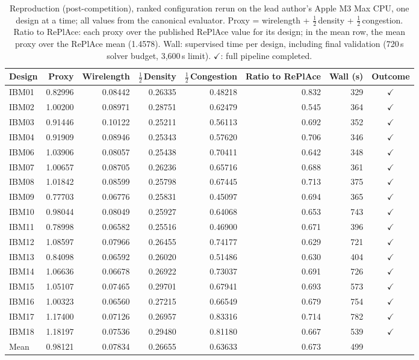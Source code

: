 \begin{table}[htbp]
\centering
\footnotesize
\caption{Reproduction (post-competition), ranked configuration rerun on the lead author's Apple M3 Max CPU, one design at a time; all values from the canonical evaluator. Proxy = wirelength + $\tfrac{1}{2}$\,density + $\tfrac{1}{2}$\,congestion. Ratio to RePlAce: each proxy over the published RePlAce value for its design; in the mean row, the mean proxy over the RePlAce mean (1.4578). Wall: supervised time per design, including final validation (720\,s solver budget, 3,600\,s limit). $\checkmark$: full pipeline completed.}
\label{tab:reproduction}
\begin{tabular}{lrrrrrrc}
\toprule
Design & Proxy & Wirelength & $\tfrac{1}{2}$\,Density & $\tfrac{1}{2}$\,Congestion & Ratio to RePlAce & Wall (s) & Outcome \\
\midrule
IBM01 & 0.82996 & 0.08442 & 0.26335 & 0.48218 & 0.832 & 329 & $\checkmark$ \\
IBM02 & 1.00200 & 0.08971 & 0.28751 & 0.62479 & 0.545 & 364 & $\checkmark$ \\
IBM03 & 0.91446 & 0.10122 & 0.25211 & 0.56113 & 0.692 & 352 & $\checkmark$ \\
IBM04 & 0.91909 & 0.08946 & 0.25343 & 0.57620 & 0.706 & 346 & $\checkmark$ \\
IBM06 & 1.03906 & 0.08057 & 0.25438 & 0.70411 & 0.642 & 348 & $\checkmark$ \\
IBM07 & 1.00657 & 0.08705 & 0.26236 & 0.65716 & 0.688 & 361 & $\checkmark$ \\
IBM08 & 1.01842 & 0.08599 & 0.25798 & 0.67445 & 0.713 & 375 & $\checkmark$ \\
IBM09 & 0.77703 & 0.06776 & 0.25831 & 0.45097 & 0.694 & 365 & $\checkmark$ \\
IBM10 & 0.98044 & 0.08049 & 0.25927 & 0.64068 & 0.653 & 743 & $\checkmark$ \\
IBM11 & 0.78998 & 0.06582 & 0.25516 & 0.46900 & 0.671 & 396 & $\checkmark$ \\
IBM12 & 1.08597 & 0.07966 & 0.26455 & 0.74177 & 0.629 & 721 & $\checkmark$ \\
IBM13 & 0.84098 & 0.06592 & 0.26020 & 0.51486 & 0.630 & 404 & $\checkmark$ \\
IBM14 & 1.06636 & 0.06678 & 0.26922 & 0.73037 & 0.691 & 726 & $\checkmark$ \\
IBM15 & 1.05107 & 0.07465 & 0.29701 & 0.67941 & 0.693 & 573 & $\checkmark$ \\
IBM16 & 1.00323 & 0.06560 & 0.27215 & 0.66549 & 0.679 & 754 & $\checkmark$ \\
IBM17 & 1.17400 & 0.07126 & 0.26957 & 0.83316 & 0.714 & 782 & $\checkmark$ \\
IBM18 & 1.18197 & 0.07536 & 0.29480 & 0.81180 & 0.667 & 539 & $\checkmark$ \\
\midrule
Mean & 0.98121 & 0.07834 & 0.26655 & 0.63633 & 0.673 & 499 &  \\
\bottomrule
\end{tabular}
\end{table}
